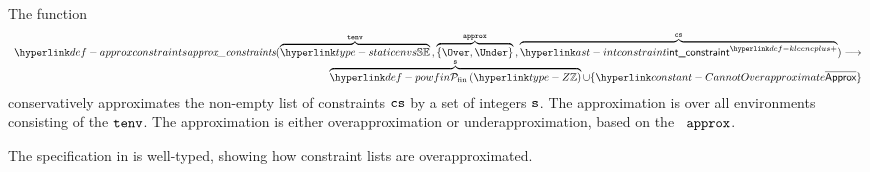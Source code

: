 \begin{mathpar}
\end{mathpar}

\begin{mathpar}
\end{mathpar}

\begin{mathpar}
\end{mathpar}

\hypertarget{def-approxconstraints}{}
The function
\[
\begin{array}{r}
\approxconstraints(
  \overname{\staticenvs}{\tenv} \aslsep
  \overname{\{\Over, \Under\}}{\vapprox} \aslsep
  \overname{\KleenePlus{\intconstraint}}{\cs}) \aslto\\
  \overname{\powfin{\Z}}{\vs} \cup \{\CannotOverapproximate\}
\end{array}
\]
conservatively approximates the non-empty list of constraints $\cs$ by a set of integers $\vs$.
The approximation is over all environments consisting of the \staticenvironmentterm{} $\tenv$.
The approximation is either overapproximation or underapproximation,
based on the \approximationdirectionterm\ $\vapprox$.

The specification in  is well-typed,
showing how constraint lists are overapproximated.

